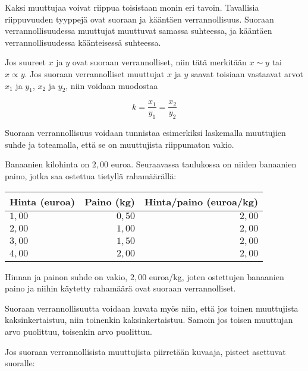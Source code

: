 Kaksi muuttujaa voivat riippua toisistaan monin eri tavoin.
Tavallisia riippuvuuden tyyppejä ovat suoraan ja kääntäen verrannollisuus.
Suoraan verrannollisuudessa muuttujat muuttuvat samassa suhteessa, ja kääntäen verrannollisuudessa käänteisessä suhteessa.


Jos suureet $x$ ja $y$ ovat suoraan verrannolliset, niin tätä merkitään $x\sim y$ tai $x\propto y$. Jos suoraan verrannolliset muuttujat $x$ ja $y$ saavat toisiaan vastaavat arvot $x_1$ ja $y_1$, $x_2$ ja $y_2$, niin voidaan muodostaa 

$$ k = \frac{x_1}{y_1} = \frac{x_2}{y_2}$$

Suoraan verrannollisuus voidaan tunnistaa esimerkiksi laskemalla muuttujien
suhde ja toteamalla, että se on muuttujista riippumaton vakio.

\begin{esimerkki}
Banaanien kilohinta on $2,00$ euroa. Seuraavassa taulukossa on niiden
banaanien paino, jotka saa ostettua tietyllä rahamäärällä:
\begin{center} 
\begin{tabular}{|l|r|r|}
\hline
Hinta (euroa) & Paino (kg) & Hinta/paino (euroa/kg) \\
\hline
$1,00$ & $0,50$ & $2,00$ \\
$2,00$ & $1,00$ & $2,00$ \\
$3,00$ & $1,50$ & $2,00$ \\
$4,00$ & $2,00$ & $2,00$ \\
\hline
\end{tabular}
\end{center}
Hinnan ja painon suhde on vakio, $2,00$ euroa/kg, joten ostettujen
banaanien paino ja niihin käytetty rahamäärä ovat suoraan verrannolliset.
\end{esimerkki}

Suoraan verrannollisuutta voidaan kuvata myös niin, että jos
toinen muuttujista kaksinkertaistuu, niin toinenkin kaksinkertaistuu.
Samoin jos toisen muuttujan arvo puolittuu, toisenkin arvo puolittuu.

Jos suoraan verrannollisista muuttujista piirretään kuvaaja, pisteet
asettuvat suoralle:


